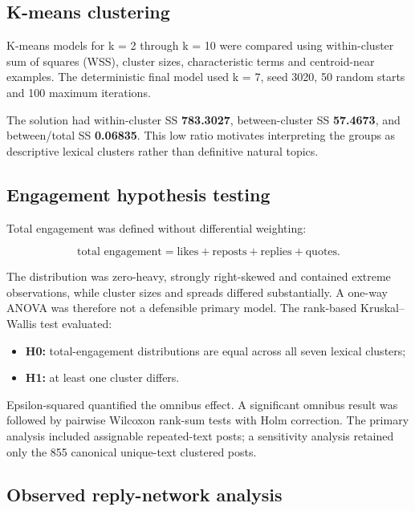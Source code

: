 \documentclass[
]{article}
\providecommand{\tightlist}{%
  \setlength{\itemsep}{0pt}\setlength{\parskip}{0pt}}
\begin{document}
\subsection{K-means clustering}\label{k-means-clustering}

K-means models for k = 2 through k = 10 were compared using
within-cluster sum of squares (WSS), cluster sizes, characteristic terms
and centroid-near examples. The deterministic final model used k = 7,
seed 3020, 50 random starts and 100 maximum iterations.

The solution had within-cluster SS \textbf{783.3027}, between-cluster SS
\textbf{57.4673}, and between/total SS \textbf{0.06835}. This low ratio
motivates interpreting the groups as descriptive lexical clusters rather
than definitive natural topics.

\subsection{Engagement hypothesis
testing}\label{engagement-hypothesis-testing}

Total engagement was defined without differential weighting:

\[
\text{total engagement}=\text{likes}+\text{reposts}+\text{replies}+\text{quotes}.
\]

The distribution was zero-heavy, strongly right-skewed and contained
extreme observations, while cluster sizes and spreads differed
substantially. A one-way ANOVA was therefore not a defensible primary
model. The rank-based Kruskal--Wallis test evaluated:

\begin{itemize}
\tightlist
\item
  \textbf{H0:} total-engagement distributions are equal across all seven
  lexical clusters;
\item
  \textbf{H1:} at least one cluster differs.
\end{itemize}

Epsilon-squared quantified the omnibus effect. A significant omnibus
result was followed by pairwise Wilcoxon rank-sum tests with Holm
correction. The primary analysis included assignable repeated-text
posts; a sensitivity analysis retained only the 855 canonical
unique-text clustered posts.

\subsection{Observed reply-network
analysis}\label{observed-reply-network-analysis}
\end{document}
